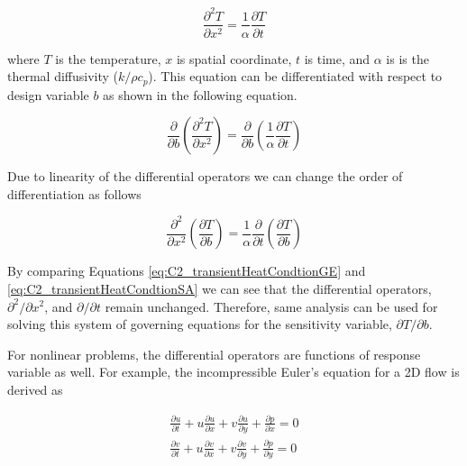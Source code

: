 \begin{equation}\label{eq:C2_transientHeatCondtionGE}
	\frac{\partial^2 T}{\partial x^2} = \frac{1}{\alpha} \frac{\partial T}{\partial t}
\end{equation}

where $T$ is the temperature, $x$ is spatial coordinate, $t$ is time, and $\alpha$ is is the thermal diffusivity ($k/\rho c_p$). This equation can be differentiated with respect to design variable $b$ as shown in the following equation.

\begin{equation*}
	\frac{\partial}{\partial b}
	\left( \frac{\partial^2 T}{\partial x^2}\right) = 
	\frac{\partial}{\partial b}
	\left( \frac{1}{\alpha} \frac{\partial T}{\partial t}\right)
\end{equation*}

Due to linearity of the differential operators we can change the order of differentiation as follows

\begin{equation}\label{eq:C2_transientHeatCondtionSA}
	\frac{\partial^2}{\partial x^2}
	\left( \frac{\partial T}{\partial b} \right) = 
	\frac{1}{\alpha} \frac{\partial}{\partial t}
	\left( \frac{\partial T}{\partial b}\right)
\end{equation}

By comparing Equations \eqref{eq:C2_transientHeatCondtionGE} and \eqref{eq:C2_transientHeatCondtionSA} we can see that the differential operators, $\partial^2 /\partial x^2$, and $\partial /\partial t$ remain unchanged. Therefore, same analysis can be used for solving this system of governing equations for the sensitivity variable, $\partial T/\partial b$.

For nonlinear problems, the differential operators are functions of response variable as well. For example, the incompressible Euler's equation for a 2D flow is derived as

\begin{subequations}\label{eq:C2_eulerEquations}
\begin{gather}
	\frac{\partial u}{\partial t} +
	u \frac{\partial u}{\partial x} + v \frac{\partial u}{\partial y} +
	\frac{\partial p}{\partial x} = 0 
	\\
	\frac{\partial v}{\partial t} +
	u \frac{\partial v}{\partial x} + v \frac{\partial v}{\partial y} +
	\frac{\partial p}{\partial y} = 0
\end{gather}
\end{subequations}

